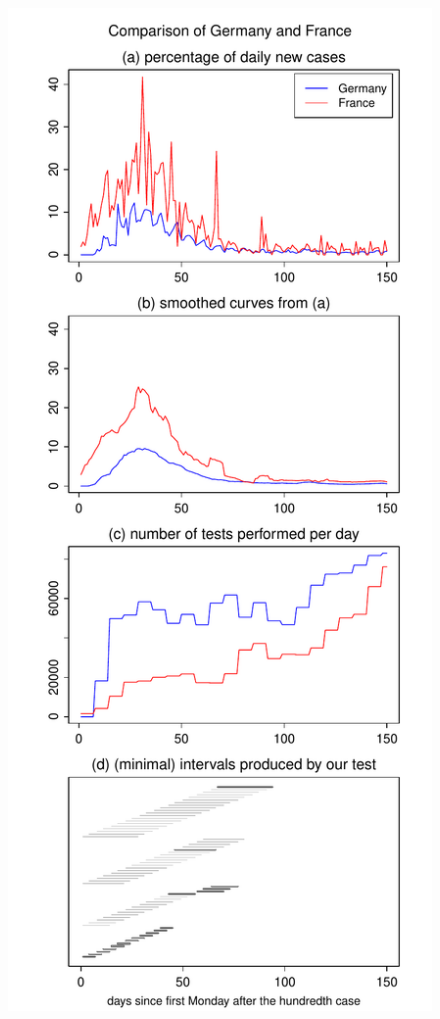 \documentclass[a4paper,12pt]{article}
\numberwithin{equation}{section}
\begin{document}
\begin{figure}[h!]
\begin{minipage}[t]{0.49\textwidth}
\includegraphics[width=\textwidth]{plots/DEU_vs_FRA_normalised}

\end{minipage}
\end{figure}
\end{document}
